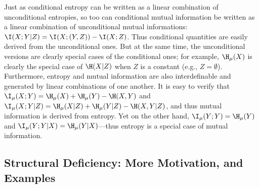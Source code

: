 \begin{subappendices}
Just as conditional entropy can be written as a linear combination of unconditional entropies, so too can conditional mutual information be written as a linear combination of unconditional mutual informations: $\I(X;Y|Z) = \I(X;(Y,Z)) - \I(X;Z)$.  
Thus conditional quantities are easily derived from the unconditional ones. But at the same time, the unconditional versions are clearly special cases of the conditional ones; for example, $\H_\mu(X)$ is clearly the special case of $\H(X|Z)$ when $Z$ is a constant (e.g., $Z = \emptyset$). 
Furthermore, entropy and mutual information are also interdefinable and generated by linear combinations of one another. 
It is easy to verify that 
$\I_\mu(X;Y) 
    = \H_\mu(X) + \H_\mu(Y) - \H(X,Y)
$
and 
$\I_\mu(X;Y|Z)
    = \H_\mu(X|Z) + \H_\mu(Y|Z) - \H(X,Y|Z)
$,
and thus mutual information is derived from entropy. 
Yet on the other hand, $\I_\mu(Y;Y) = \H_\mu(Y)$ and $\I_\mu(Y;Y|X) = \H_\mu(Y|X)$---thus entropy is a special case of mutual information. 
    
\subsection{Structural Deficiency: More Motivation, and Examples}
% 


\end{subappendices}
